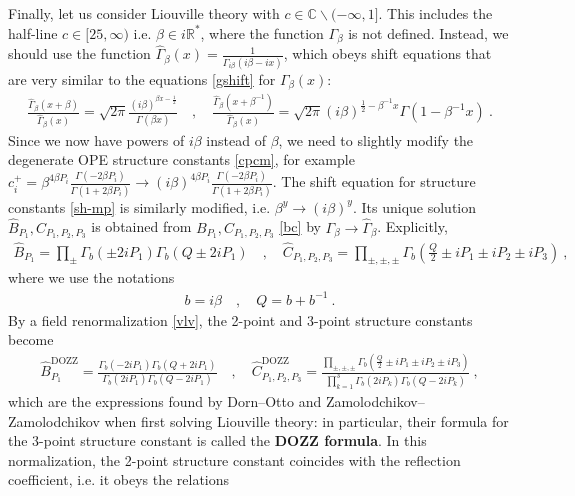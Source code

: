\documentclass[12pt, a4paper]{article}
\newcommand{\myindex}[1]{\textbf{\boldmath #1}}
\begin{document}
Finally, let us consider Liouville theory with $c\in \mathbb{C}\backslash (-\infty,1]$. This includes the half-line $c\in [25,\infty)$ i.e. $\beta\in i\mathbb{R}^*$, where the function $\Gamma_\beta$ is not defined.
Instead, we should use the function $\hat{\Gamma}_\beta(x) = \frac{1}{\Gamma_{i\beta}(i\beta -ix)}$, which obeys shift equations that are very similar to the equations \eqref{gshift} for $\Gamma_\beta(x)$: 
\begin{align}
 \frac{\hat\Gamma_\beta(x+\beta)}{\hat\Gamma_\beta(x)} = \sqrt{2\pi}\frac{(i\beta)^{\beta x-\frac12}}{\Gamma(\beta x)}
\quad , \quad 
\frac{\hat\Gamma_\beta(x+\beta^{-1})}{\hat\Gamma_\beta(x)} = \sqrt{2\pi}(i\beta)^{\frac12-\beta^{-1}x}\Gamma(1-\beta^{-1}x) \ .
\label{hgshift}
\end{align}
Since we now have powers of $i\beta$ instead of $\beta$, we need to slightly modify the degenerate OPE structure constants \eqref{cpcm}, for example $c_i^+ = \beta^{4\beta P_i}\frac{\Gamma(-2\beta P_i)}{\Gamma(1+2\beta P_i)} \to (i\beta)^{4\beta P_i}\frac{\Gamma(-2\beta P_i)}{\Gamma(1+2\beta P_i)}$. The shift equation for structure constants \eqref{sh-mp} is similarly modified, i.e. $\beta^y \to (i\beta)^y$. Its unique solution $\hat B_{P_1},\hat C_{P_1,P_2,P_3}$ is obtained from $B_{P_1},C_{P_1,P_2,P_3}$ \eqref{bc} by $\Gamma_\beta \to \hat\Gamma_\beta$. Explicitly,
\begin{align}
 \boxed{\hat B_{P_1} = \prod_\pm \Gamma_b\left(\pm 2iP_1\right)\Gamma_b\left(Q\pm 2iP_1\right)} \quad , \quad 
 \boxed{\hat C_{P_1,P_2,P_3} = \prod_{\pm,\pm,\pm} \Gamma_b\left(\tfrac{Q}{2} \pm iP_1\pm iP_2\pm iP_3\right)}\ ,
 \label{bci}
\end{align}
where we use the notations 
\begin{align}
 b = i\beta \quad , \quad Q = b + b^{-1} \ . 
 \label{bQ}
\end{align}
By a field renormalization \eqref{vlv}, the 2-point and 3-point structure constants become 
\begin{align}
 \hat B^\text{DOZZ}_{P_1} = \frac{\Gamma_b\left(- 2iP_1\right)\Gamma_b\left(Q+ 2iP_1\right)}{\Gamma_b\left( 2iP_1\right)\Gamma_b\left(Q- 2iP_1\right)} \quad , \quad 
 \hat C^\text{DOZZ}_{P_1,P_2,P_3} = \frac{\prod_{\pm,\pm,\pm} \Gamma_b\left(\tfrac{Q}{2} \pm iP_1\pm iP_2\pm iP_3\right)}{\prod_{k=1}^3 \Gamma_b(2iP_k)\Gamma_b(Q-2iP_k)}\ ,
 \label{dozz}
\end{align}
which are the expressions found by Dorn--Otto and Zamolodchikov--Zamolodchikov when first solving Liouville theory: in particular, their formula for the 3-point structure constant is called the \myindex{DOZZ formula}. In this normalization, the 2-point structure constant coincides with the reflection coefficient, i.e. it obeys the relations 
\end{document}
